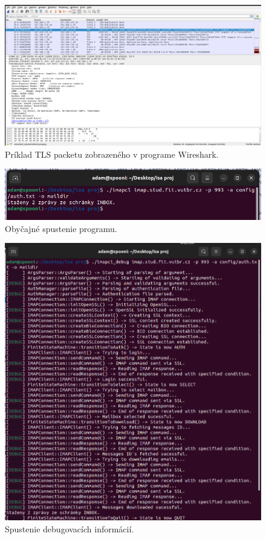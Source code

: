 \documentclass[a4paper, 11pt]{article}
\begin{document}
	\label{subsection:testwireshark}
	\begin{figure}[!ht]
		\centering
		\vspace{1cm}
		\includegraphics[width=0.9\linewidth]{res/test_wireshark.png}
		\caption{Príklad TLS packetu zobrazeného v programe Wireshark.}
		\label{figure:testwireshark}
	\end{figure}
	\label{subsection:testbasic}
	\begin{figure}[!ht]
		\centering
		\vspace{1cm}
		\includegraphics[width=0.9\linewidth]{res/test_basic.png}
		\caption{Obyčajné spustenie programu.}
		\label{figure:testbasic}
	\end{figure}
	\label{subsection:testdebug}
	\begin{figure}[!ht]
		\centering
		\vspace{1cm}
		\includegraphics[width=0.9\linewidth]{res/test_debug.png}
		\caption{Spustenie debugovacích informácií.}
		\label{figure:testdebug}
	\end{figure}
\end{document}
